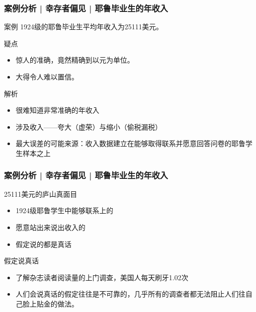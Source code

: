 \begin{frame}
  \frametitle{案例分析 | 幸存者偏见 | 耶鲁毕业生的年收入}
  \begin{block}{案例}
    1924级的耶鲁毕业生平均年收入为25111美元。
  \end{block}
  \pause \pause \pause \pause
  \begin{block}{疑点}
    \begin{itemize}
      \item 惊人的准确，竟然精确到以元为单位。
      \item 大得令人难以置信。
    \end{itemize}
  \end{block}
  \pause
  \begin{block}{解析}
    \begin{itemize}
      \item 很难知道非常准确的年收入
      \item 涉及收入——夸大（虚荣）与缩小（偷税漏税）
      \item 最大误差的可能来源：收入数据建立在能够取得联系并愿意回答问卷的耶鲁学生样本之上
    \end{itemize}
  \end{block}
\end{frame}

\begin{frame}
  \frametitle{案例分析 | 幸存者偏见 | 耶鲁毕业生的年收入}
  \begin{block}{25111美元的庐山真面目}
    \begin{itemize}
      \item 1924级耶鲁学生中能够联系上的
      \item 愿意站出来说出收入的
      \item 假定说的都是真话
    \end{itemize}
  \end{block}
  \pause
  \begin{block}{假定说真话}
    \begin{itemize}
      \item 了解杂志读者阅读量的上门调查，美国人每天刷牙1.02次
      \item 人们会说真话的假定往往是不可靠的，几乎所有的调查者都无法阻止人们往自己脸上贴金的做法。
    \end{itemize}
  \end{block}
\end{frame}


